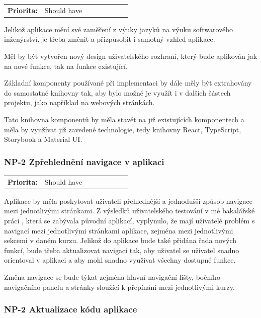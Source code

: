 \begin{tabular}{lp{0.7\linewidth}}
    \textbf{Priorita:} & Should have \\
\end{tabular}

Jelikož aplikace mění své zaměření z výuky jazyků na výuku softwarového inženýrství, je třeba změnit a přizpůsobit i samotný vzhled aplikace.

Měl by být vytvořen nový design uživatelského rozhraní, který bude aplikován jak na nové funkce, tak na funkce existující.

Základní komponenty používané při implementaci by dále měly být extrahovány do samostatné knihovny tak, aby bylo možné je využít i v dalších částech projektu, jako například na webových stránkách.

Tato knihovna komponentů by měla stavět na již existujících komponentech a měla by využívat již zavedené technologie, tedy knihovny React, TypeScript, Storybook a Material UI.


\subsubsection{NP-2 Zpřehlednění navigace v aplikaci}

\begin{tabular}{lp{0.7\linewidth}}
    \textbf{Priorita:} & Should have \\
\end{tabular}

Aplikace by měla poskytovat uživateli přehlednější a jednodušší způsob navigace mezi jednotlivými stránkami. Z výsledků uživatelského testování v mé bakalářské práci \cite{Jenicek2024BachelorThesis}, která se zabývala původní aplikací, vyplynulo, že mají uživatelé problém s navigací mezi jednotlivými stránkami aplikace, zejména mezi jednotlivými sekcemi v daném kurzu. Jelikož do aplikace bude také přidána řada nových funkcí, bude třeba aktualizovat navigaci tak, aby uživatel se uživatel snadno orientoval v aplikaci a aby mohl snadno využívat všechny dostupné funkce.

Změna navigace se bude týkat zejména hlavní navigační lišty, bočního navigačního panelu a stránky sloužící k přepínání mezi jednotlivými kurzy.

\subsubsection{NP-2 Aktualizace kódu aplikace}

